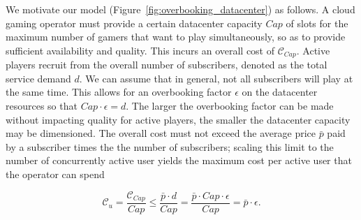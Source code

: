 
We motivate our model (Figure~\ref{fig:overbooking_datacenter}) as follows. A cloud gaming operator must provide a certain datacenter capacity $Cap$ of slots for the maximum number of gamers that want to play simultaneously, so as to provide sufficient availability and quality. This incurs an overall cost of $\mathcal{C}_{Cap}$. Active players recruit from the overall number of subscribers, denoted as the total service demand $d$. We can assume that in general, not all subscribers will play at the same time. This allows for an overbooking factor $\epsilon$ on the datacenter resources so that $Cap \cdot \epsilon = d$. The larger the overbooking factor can be made without impacting quality for active players, the smaller the datacenter capacity may be dimensioned. %
The overall cost must not exceed the average price $\bar{p}$ paid by a subscriber times the the number of subscribers;
scaling this limit to the number of concurrently active user yields the maximum cost per active user that the operator can spend

\begin{equation}
  \mathcal{C}_u = \frac{\mathcal{C}_{Cap}}{Cap} \leq \frac{\bar{p} \cdot d}{Cap} = \frac{\bar{p} \cdot Cap \cdot \epsilon}{Cap} = \bar{p} \cdot \epsilon.
\end{equation}



